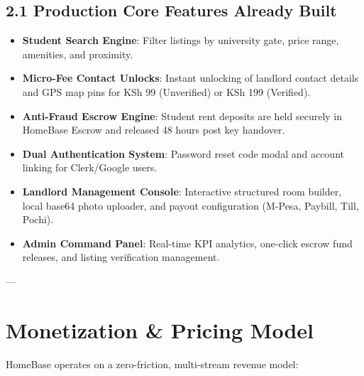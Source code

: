 \documentclass[11pt,a4paper]{article}
\begin{document}
\subsection{2.1 Production Core Features Already Built}
\begin{itemize}
    \item \textbf{Student Search Engine}: Filter listings by university gate, price range, amenities, and proximity.
    \item \textbf{Micro-Fee Contact Unlocks}: Instant unlocking of landlord contact details and GPS map pins for KSh 99 (Unverified) or KSh 199 (Verified).
    \item \textbf{Anti-Fraud Escrow Engine}: Student rent deposits are held securely in HomeBase Escrow and released 48 hours post key handover.
    \item \textbf{Dual Authentication System}: Password reset code modal and account linking for Clerk/Google users.
    \item \textbf{Landlord Management Console}: Interactive structured room builder, local base64 photo uploader, and payout configuration (M-Pesa, Paybill, Till, Pochi).
    \item \textbf{Admin Command Panel}: Real-time KPI analytics, one-click escrow fund releases, and listing verification management.
\end{itemize}

---

\section{Monetization \& Pricing Model}

HomeBase operates on a zero-friction, multi-stream revenue model:
\end{document}
